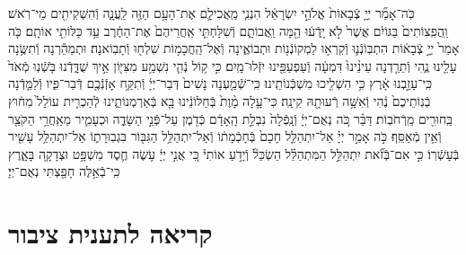 \documentclass[twoside, openany, parskip=half, 11pt]{book}
\begin{document}
\begin{footnotesize}
\begin{multicols}{2}
כֹּֽה־אָמַ֞ר יְיָ֤ צְֿבָאוֹת֙ אֱלֹהֵ֣י יִשְׂרָאֵ֔ל הִנְנִ֧י מַֽאֲכִילָ֛ם אֶת־הָעָ֥ם הַזֶּ֖ה לַֽעֲנָ֑ה וְֿהִשְׁקִיתִ֖ים מֵי־רֹֽאשׁ׃ וַֽהֲפִֽצוֹתִים֙ בַּגּוֹיִ֔ם אֲשֶׁר֙ לֹ֣א יָֽדְֿע֔וּ הֵ֖מָּה וַֽאֲבוֹתָ֑ם וְֿשִׁלַּחְתִּ֤י אַֽחֲרֵיהֶם֙ אֶת־הַחֶ֔רֶב עַ֥ד כַּלּוֹתִ֖י אוֹתָֽם׃ כֹּ֤ה אָמַר֙ יְיָ֣ צְֿבָא֔וֹת הִתְבּֽוֹנְֿנ֛וּ וְֿקִרְא֥וּ לַמְקוֹנְֿנ֖וֹת וּתְבוֹאֶ֑ינָה וְֿאֶל־הַֽחֲכָמ֥וֹת שִׁלְח֖וּ וְֿתָבֽוֹאנָה׃ וּתְמַהֵ֕רְנָה וְֿתִשֶּׂ֥נָה עָלֵ֖ינוּ נֶ֑הִי וְֿתֵרַ֤דְנָה עֵינֵ֨ינוּ֙ דִּמְעָ֔ה וְֿעַפְעַפֵּ֖ינוּ יִזְּֿלוּ־מָֽיִם׃ כִּ֣י ק֥וֹל נְֿהִ֛י נִשְׁמַ֥ע מִצִּיּ֖וֹן אֵ֣יךְ שֻׁדָּ֑דְֿנוּ בֹּ֤שְֿׁנֽוּ מְֿאֹד֙ כִּֽי־עָזַ֣בְנוּ אָ֔רֶץ כִּ֥י הִשְׁלִ֖יכוּ מִשְׁכְּֿנוֹתֵֽינוּ׃ כִּֽי־שְֿׁמַ֤עְנָה נָשִׁים֙ דְּבַר־יְיָ֔ וְֿתִקַּ֥ח אָזְֿנְֿכֶ֖ם דְּֿבַר־פִּ֑יו וְֿלַמֵּ֤דְֿנָה בְֿנֽוֹתֵיכֶם֙ נֶ֔הִי וְֿאִשָּׁ֥ה רְֿעוּתָ֖הּ קִינָֽה׃ כִּי־עָ֤לָה מָ֨וֶת֙ בְּֿחַלּוֹנֵ֔ינוּ בָּ֖א בְּֿאַרְמְנוֹתֵ֑ינוּ לְֿהַכְרִ֤ית עוֹלָל֙ מִח֔וּץ בַּֽחוּרִ֖ים מֵֽרְֿחֹבֽוֹת׃ דַּבֵּ֗ר כֹּ֚ה נְאֻם־יְיָ֔ וְֿנָֽפְֿלָה֙ נִבְלַ֣ת הָֽאָדָ֔ם כְּֿדֹ֖מֶן עַל־פְּֿנֵ֣י הַשָּׂדֶ֑ה וּכְעָמִ֛יר מֵאַֽחֲרֵ֥י הַקֹּצֵ֖ר וְֿאֵ֥ין מְֿאַסֵּֽף׃ כֹּ֣ה אָמַ֣ר יְיָ֗ אַל־יִתְהַלֵּ֤ל חָכָם֙ בְּֿחָכְֿמָת֔וֹ וְֿאַל־יִתְהַלֵּ֥ל הַגִּבּ֖וֹר בִּגְבֽוּרָת֑וֹ אַל־יִתְהַלֵּ֥ל עָשִׁ֖יר בְּֿעָשְֿׁרֽוֹ׃ כִּ֣י אִם־בְּֿזֹ֞את יִתְהַלֵּ֣ל הַמִּתְהַלֵּ֗ל הַשְׂכֵּל֘ וְֿיָדֹ֣עַ אוֹתִי֒ כִּ֚י אֲנִ֣י יְיָ֔ עֹ֥שֶׂה חֶ֛סֶד מִשְׁפָּ֥ט וּצְדָקָ֖ה בָּאָ֑רֶץ כִּֽי־בְֿאֵ֥לֶּה חָפַ֖צְתִּי נְאֻם־יְיָ׃

\end{multicols}

\section[תענית ציבור]{קריאה לתענית ציבור}\label{torah taanis tzibbur}



\end{footnotesize}
\end{document}
